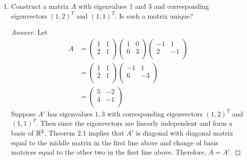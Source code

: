 \documentclass[../psets.tex]{subfiles}
\begin{document}
\begin{enumerate}[label={\textbf{2.\arabic*.}}]
\begin{proof}[Answer]
\begin{align*}
\begin{pmatrix}
                1+3\cdot 5^{2004} & -3+3\cdot 5^{2004}\\
                -1+5^{2004} & 3+5^{2004}\\
            \end{pmatrix}
        \end{align*}
    \end{proof}
    \item Construct a matrix $A$ with eigenvalues 1 and 3 and corresponding eigenvectors $(1,2)^T$ and $(1,1)^T$. Is such a matrix unique?
    \begin{proof}[Answer]
        Let
        \begin{align*}
            A &=
            \begin{pmatrix}
                1 & 1\\
                2 & 1\\
            \end{pmatrix}
            \begin{pmatrix}
                1 & 0\\
                0 & 3\\
            \end{pmatrix}
            \begin{pmatrix}
                -1 & 1\\
                2 & -1\\
            \end{pmatrix}\\
            &=
            \begin{pmatrix}
                1 & 1\\
                2 & 1\\
            \end{pmatrix}
            \begin{pmatrix}
                -1 & 1\\
                6 & -3\\
            \end{pmatrix}\\
            &=
            \begin{pmatrix}
                5 & -2\\
                4 & -1\\
            \end{pmatrix}
        \end{align*}
        Suppose $A'$ has eigenvalues $1,3$ with corresponding eigenvectors $(1,2)^T$ and $(1,1)^T$. Then since the eigenvectors are linearly independent and form a basis of $\mathbb{R}^2$, Theorem 2.1 implies that $A'$ is diagonal with diagonal matrix equal to the middle matrix in the first line above and change of basis matrices equal to the other two in the first line above. Therefore, $A=A'$.

\end{proof}
\end{enumerate}
\end{document}
